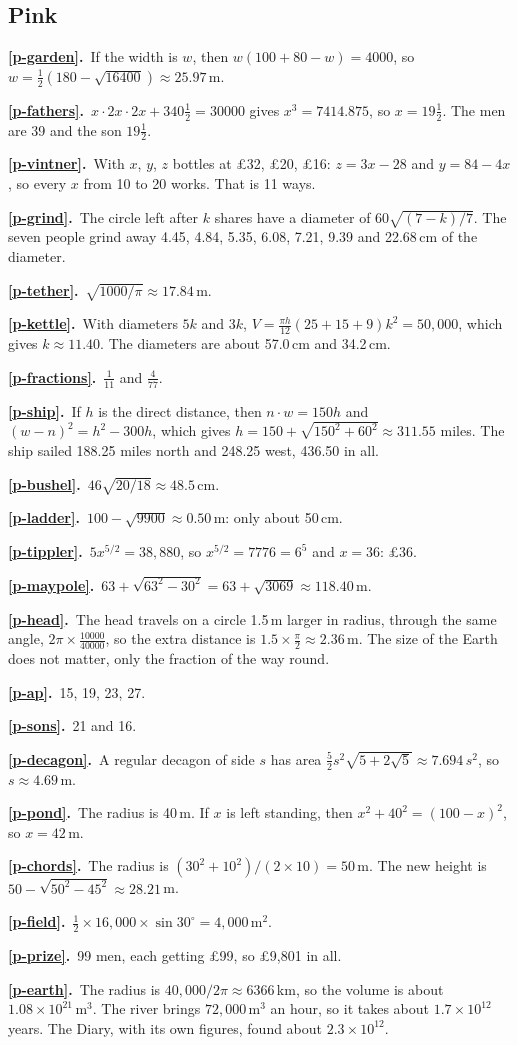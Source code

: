 \documentclass[11pt,a4paper]{article}
\newcommand{\ans}[2]{\par\smallskip\noindent\textbf{\ref{#1}.}\ #2}
\begin{document}
\subsection*{\color{bandpink}Pink}
\ans{p-garden}{If the width is $w$, then $w(100+80-w) = 4000$, so
$w = \tfrac12\left(180-\sqrt{16400}\right) \approx 25.97$\,m.}
\ans{p-fathers}{$x\cdot2x\cdot2x + 340\tfrac12 = 30000$ gives $x^3 = 7414.875$, so
$x = 19\tfrac12$. The men are 39 and the son $19\tfrac12$.}
\ans{p-vintner}{With $x$, $y$, $z$ bottles at £32, £20, £16: $z = 3x-28$ and $y = 84-4x$,
so every $x$ from 10 to 20 works. That is 11 ways.}
\ans{p-grind}{The circle left after $k$ shares have a diameter of $60\sqrt{(7-k)/7}$.
The seven people grind away 4.45, 4.84, 5.35, 6.08, 7.21, 9.39 and 22.68\,cm of the
diameter.}
\ans{p-tether}{$\sqrt{1000/\pi} \approx 17.84$\,m.}
\ans{p-kettle}{With diameters $5k$ and $3k$,
$V = \tfrac{\pi h}{12}\left(25+15+9\right)k^2 = 50{,}000$, which gives $k \approx 11.40$.
The diameters are about 57.0\,cm and 34.2\,cm.}
\ans{p-fractions}{$\tfrac1{11}$ and $\tfrac4{77}$.}
\ans{p-ship}{If $h$ is the direct distance, then $n\cdot w = 150h$ and $(w-n)^2 = h^2 -
300h$, which gives $h = 150+\sqrt{150^2+60^2} \approx 311.55$ miles. The ship sailed
188.25 miles north and 248.25 west, 436.50 in all.}
\ans{p-bushel}{$46\sqrt{20/18} \approx 48.5$\,cm.}
\ans{p-ladder}{$100-\sqrt{9900} \approx 0.50$\,m: only about 50\,cm.}
\ans{p-tippler}{$5x^{5/2} = 38{,}880$, so $x^{5/2} = 7776 = 6^5$ and $x = 36$: £36.}
\ans{p-maypole}{$63+\sqrt{63^2-30^2} = 63+\sqrt{3069} \approx 118.40$\,m.}
\ans{p-head}{The head travels on a circle 1.5\,m larger in radius, through the same
angle, $2\pi\times\tfrac{10000}{40000}$, so the extra distance is
$1.5\times\tfrac{\pi}{2} \approx 2.36$\,m. The size of the Earth does not matter, only the
fraction of the way round.}
\ans{p-ap}{15, 19, 23, 27.}
\ans{p-sons}{21 and 16.}
\ans{p-decagon}{A regular decagon of side $s$ has area $\tfrac52 s^2\sqrt{5+2\sqrt5}
\approx 7.694\,s^2$, so $s \approx 4.69$\,m.}
\ans{p-pond}{The radius is 40\,m. If $x$ is left standing, then $x^2+40^2 = (100-x)^2$,
so $x = 42$\,m.}
\ans{p-chords}{The radius is $(30^2+10^2)/(2\times10) = 50$\,m. The new height is
$50-\sqrt{50^2-45^2} \approx 28.21$\,m.}
\ans{p-field}{$\tfrac12\times16{,}000\times\sin30^\circ = 4{,}000$\,m$^2$.}
\ans{p-prize}{99 men, each getting £99, so £9,801 in all.}
\ans{p-earth}{The radius is $40{,}000/2\pi \approx 6366$\,km, so the volume is about
$1.08\times10^{21}$\,m$^3$. The river brings $72{,}000$\,m$^3$ an hour, so it takes
about $1.7\times10^{12}$ years. The Diary, with its own figures, found about
$2.3\times10^{12}$.}
\end{document}
